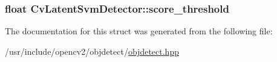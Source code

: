 \hypertarget{structCvLatentSvmDetector_a29e3e3b5a0fa4f040aa465ff3f06b124}{
\subsubsection[{score\-\_\-threshold}]{\setlength{\rightskip}{0pt plus 5cm}float Cv\-Latent\-Svm\-Detector\-::score\-\_\-threshold}}\label{structCvLatentSvmDetector_a29e3e3b5a0fa4f040aa465ff3f06b124}


The documentation for this struct was generated from the following file\-:\begin{DoxyCompactItemize}
\item 
/usr/include/opencv2/objdetect/\hyperlink{objdetect_8hpp}{objdetect.\-hpp}\end{DoxyCompactItemize}
